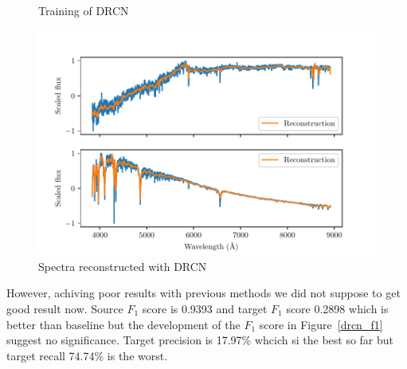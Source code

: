 \begin{figure}
\caption{Training of DRCN}
\label{drcn_training}
\end{figure}

\begin{figure}
	\includegraphics[width=\textwidth]{img/reconstructed_spectra.pdf}
	\caption{Spectra reconstructed with DRCN}
	\label{reconstruction}
\end{figure}

However, achiving poor results with previous methods
we did not suppose to get good result now.
Source \(F_1\) score is 0.9393 and target \(F_1\) score 0.2898
which is better than baseline
but the development of the \(F_1\) score in Figure~\ref{drcn_f1} suggest no significance.
Target precision is 17.97\% whcich si the best so far
but target recall 74.74\% is the worst.

